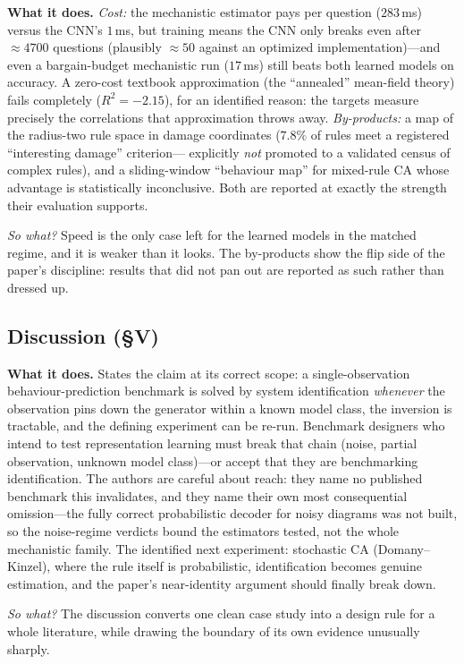 \documentclass[11pt,a4paper]{article}
\newcommand{\sowhat}[1]{\emph{So what?} #1}
\begin{document}
\textbf{What it does.} \emph{Cost:} the mechanistic estimator pays per
question ($283$\,ms) versus the CNN's $1$\,ms, but training means the CNN
only breaks even after ${\approx}4700$ questions (plausibly ${\approx}50$
against an optimized implementation)---and even a bargain-budget mechanistic
run ($17$\,ms) still beats both learned models on accuracy. A zero-cost
textbook approximation (the ``annealed'' mean-field theory) fails
completely ($R^2=-2.15$), for an identified reason: the targets measure
precisely the correlations that approximation throws away.
\emph{By-products:} a map of the radius-two rule space in damage coordinates
($7.8\%$ of rules meet a registered ``interesting damage'' criterion---
explicitly \emph{not} promoted to a validated census of complex rules), and
a sliding-window ``behaviour map'' for mixed-rule CA whose advantage is
statistically inconclusive. Both are reported at exactly the strength their
evaluation supports.

\sowhat{Speed is the only case left for the learned models in the matched
regime, and it is weaker than it looks. The by-products show the flip side
of the paper's discipline: results that did not pan out are reported as
such rather than dressed up.}

\subsection*{Discussion (\S V)}

\textbf{What it does.} States the claim at its correct scope: a
single-observation behaviour-prediction benchmark is solved by system
identification \emph{whenever} the observation pins down the generator
within a known model class, the inversion is tractable, and the defining
experiment can be re-run. Benchmark designers who intend to test
representation learning must break that chain (noise, partial observation,
unknown model class)---or accept that they are benchmarking identification.
The authors are careful about reach: they name no published benchmark this
invalidates, and they name their own most consequential omission---the
fully correct probabilistic decoder for noisy diagrams was not built, so
the noise-regime verdicts bound the estimators tested, not the whole
mechanistic family. The identified next experiment: stochastic CA
(Domany--Kinzel), where the rule itself is probabilistic, identification
becomes genuine estimation, and the paper's near-identity argument should
finally break down.

\sowhat{The discussion converts one clean case study into a design rule for
a whole literature, while drawing the boundary of its own evidence
unusually sharply.}
\end{document}
